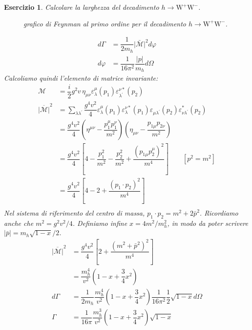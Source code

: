 \documentclass[italian,a4paper]{article}
\newtheorem{exercise}{Esercizio}
\theoremstyle{definition}
\newcommand{\wboson}{\ensuremath{\mathrm{W}}}
\begin{document}
\begin{exercise}
    Calcolare la larghezza del decadimento $h \rightarrow \wboson^+ \wboson^-$.
\begin{figure}[h]
    \begin{center}
        
    \end{center}
    \caption{grafico di Feynman al primo ordine per il decadimento $h \rightarrow \wboson^+ \wboson^-$.}
    \label{fig:hWW}
\end{figure}
\begin{align*}
    d\Gamma &= \dfrac{1}{2 m_h} \lvert \bar{\mathscr{M}} \rvert ^2 d \varphi\\
    d\varphi &= \dfrac{1}{16 \pi^2} \dfrac{\lvert p \rvert}{m_h} d \Omega
\end{align*}
Calcoliamo quindi l'elemento di matrice invariante:
\begin{align*}
    \mathscr{M} &= \dfrac{i}{2} g^2 v \, \eta_{\mu\nu}
    \varepsilon^{\mu}_{\lambda}(p_1) \varepsilon^{\nu
    *}_{\lambda^\prime}(p_2)\\
    \overline{\lvert \mathscr{M} \rvert}^2
    &= \sum_{\lambda \lambda^\prime}^{}
    \dfrac{g^4 v^2}{4}
    \varepsilon^{\mu}_{\lambda}(p_1) \varepsilon^{\nu *}_{\lambda}(p_1)     
    \varepsilon_{\mu\lambda^\prime}(p_2) \varepsilon^{*}_{\nu\lambda^\prime}(p_2)\\
    &= 
    \dfrac{g^4 v^2}{4}
    \left( \eta^{\mu\nu} - \dfrac{p_1^\mu p_1^\nu}{m^2} \right)
    \left( \eta_{\mu\nu} - \dfrac{p_{1\mu} p_{2\nu}}{m^2} \right)\\
    &= 
    \dfrac{g^4 v^2}{4}
    \left[ 4 - \dfrac{p_1^2}{m^2} - \dfrac{p_2^2}{m^2} +
    \dfrac{(p_{1\mu}p^{\mu}_2)^2}{m^4}\right] \qquad [p^2 = m^2]\\
    &= 
    \dfrac{g^4 v^2}{4}
    \left[ 4 - 2 +
    \dfrac{(p_1\cdot p_2)^2}{m^4}\right]\\
\end{align*}
Nel sistema di riferimento del centro di massa, $p_1 \cdot p_2 = m^2 + 2
\bar p ^2$. Ricordiamo anche che $m^2 = g^2 v^2 / 4$. Definiamo infine
$x = 4m^2 / m_h^2$, in modo da poter scrivere $|\bar p| = m_h\sqrt{1 - x}/2$.
\begin{align*}
    \overline{\lvert \mathscr{M} \rvert}^2
    &= 
    \dfrac{g^4 v^2}{4}
    \left[ 2 + \dfrac{(m^2 + \bar p^2)^2}{m^4} \right]\\
    &= \dfrac{m_h^4}{v^2} \left( 1 - x + \dfrac{3}{4}x^2 \right)\\
    d \Gamma
    &= 
    \dfrac{1}{2m_h} \dfrac{m_h^4}{v^2}\left( 1 - x + \dfrac{3}{4}x^2 \right)
    \dfrac{1}{16 \pi^2} \dfrac{1}{2}\sqrt{1 - x} d\Omega\\
    \Gamma
    &= 
    \dfrac{1}{16\pi}\dfrac{m_h^3}{v^2} \left( 1 - x + \dfrac{3}{4}x^2 \right)\sqrt{1 - x}
\end{align*}
\end{exercise}
\end{document}
